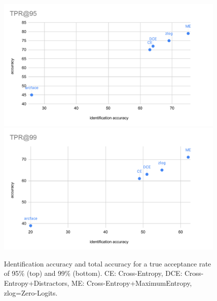 \begin{figure}
    \centering
    \includegraphics[width=\columnwidth]{50-files/TPR@95.pdf}
    \includegraphics[width=\columnwidth]{50-files/TPR@99.pdf}
    \caption{Identification accuracy and total accuracy for a true acceptance rate of 95\% (top) and 99\% (bottom). CE: Cross-Entropy, DCE: Cross-Entropy+Distractors, ME: Cross-Entropy+MaximumEntropy, zlog=Zero-Logits.}
    \label{fig:tpr}
\end{figure}


